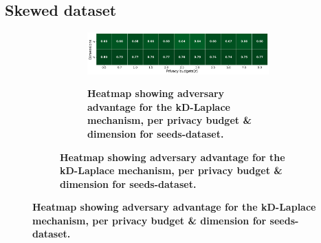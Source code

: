 \subsection{Skewed dataset}
\begin{figure}[H]
    \centering
    \begin{subfigure}[b]{0.85\textwidth}
        \begin{subfigure}[c]{1\textwidth}
            \caption{\textbf{Heatmap showing adversary advantage for the kD-Laplace mechanism, per privacy budget \& dimension for seeds-dataset.}}
            \includegraphics[width=1\textwidth]{Results/kd-laplace/kd-Laplace/skewed-dataset/shokri_mi_adv.png}
            \label{fig:privacy_skewed-dataset_adversial_advantage_kd-laplace}
        \end{subfigure}
        \vfill %


\end{subfigure}
\end{figure}
